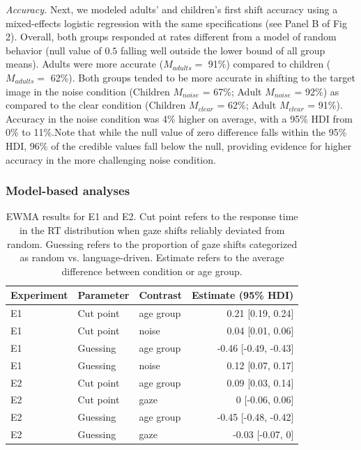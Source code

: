 \documentclass[10pt, letterpaper]{article}
\begin{document}
\emph{Accuracy.} Next, we modeled adults' and children's first shift
accuracy using a mixed-effects logistic regression with the same
specifications (see Panel B of Fig 2). Overall, both groups responded at
rates different from a model of random behavior (null value of \(0.5\)
falling well outside the lower bound of all group means). Adults were
more accurate (\(M_{adults} =\) 91\%) compared to children
(\(M_{adults} =\) 62\%). Both groups tended to be more accurate in
shifting to the target image in the noise condition (Children
\(M_{noise}\) = 67\%; Adult \(M_{noise}\) = 92\%) as compared to the
clear condition (Children \(M_{clear}\) = 62\%; Adult \(M_{clear}\) =
91\%). Accuracy in the noise condition was 4\% higher on average, with a
95\% HDI from 0\% to 11\%.Note that while the null value of zero
difference falls within the 95\% HDI, 96\% of the credible values fall
below the null, providing evidence for higher accuracy in the more
challenging noise condition.

\subsubsection{Model-based analyses}\label{model-based-analyses}

\begin{table}[b]
\centering
\begin{tabular}{lllr}
  \hline
Experiment & Parameter & Contrast & Estimate (95\% HDI) \\ 
  \hline
E1 & Cut point & age group & 0.21 [0.19, 0.24] \\ 
  E1 & Cut point & noise & 0.04 [0.01, 0.06] \\ 
  E1 & Guessing & age group & -0.46 [-0.49, -0.43] \\ 
  E1 & Guessing & noise & 0.12 [0.07, 0.17] \\ 
   \hline
E2 & Cut point & age group & 0.09 [0.03, 0.14] \\ 
  E2 & Cut point & gaze & 0 [-0.06, 0.06] \\ 
  E2 & Guessing & age group & -0.45 [-0.48, -0.42] \\ 
  E2 & Guessing & gaze & -0.03 [-0.07, 0] \\ 
   \hline
\end{tabular}
\caption{EWMA results for E1 and E2. Cut point refers to the response time in the RT distribution when gaze shifts reliably deviated from random. Guessing refers to the proportion of gaze shifts categorized as random vs. language-driven. Estimate refers to the average difference between condition or age group.} 
\end{table}
\end{document}
